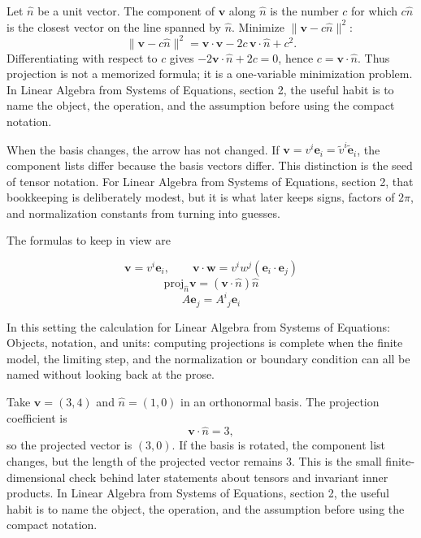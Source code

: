Let \(\hat n\) be a unit vector.  The component of \(\bm v\) along \(\hat n\) is the number \(c\) for which \(c\hat n\) is the closest vector on the line spanned by \(\hat n\).  Minimize \(\|\bm v-c\hat n\|^2\):
\[
  \|\bm v-c\hat n\|^2=\bm v\cdot\bm v-2c\,\bm v\cdot\hat n+c^2.
\]
Differentiating with respect to \(c\) gives \(-2\bm v\cdot\hat n+2c=0\), hence \(c=\bm v\cdot\hat n\).  Thus projection is not a memorized formula; it is a one-variable minimization problem.  In Linear Algebra from Systems of Equations, section 2, the useful habit is to name the object, the operation, and the assumption before using the compact notation.

When the basis changes, the arrow has not changed.  If \(\bm v=v^i\bm e_i=\tilde v^i\tilde{\bm e}_i\), the component lists differ because the basis vectors differ.  This distinction is the seed of tensor notation.  For Linear Algebra from Systems of Equations, section 2, that bookkeeping is deliberately modest, but it is what later keeps signs, factors of \(2\pi\), and normalization constants from turning into guesses.

The formulas to keep in view are

\[
  \bm v=v^i\bm e_i,\qquad \bm v\cdot\bm w=v^iw^j(\bm e_i\cdot\bm e_j)
\]
\[
  \mathrm{proj}_{\hat n}\bm v=(\bm v\cdot\hat n)\hat n
\]
\[
  A\bm e_j=A^i{}_j\bm e_i
\]

In this setting the calculation for Linear Algebra from Systems of Equations: Objects, notation, and units: computing projections is complete when the finite model, the limiting step, and the normalization or boundary condition can all be named without looking back at the prose.




\begin{example}
Take \(\bm v=(3,4)\) and \(\hat n=(1,0)\) in an orthonormal basis.  The projection coefficient is
\[
  \bm v\cdot\hat n=3,
\]
so the projected vector is \((3,0)\).  If the basis is rotated, the component list changes, but the length of the projected vector remains \(3\).  This is the small finite-dimensional check behind later statements about tensors and invariant inner products.  In Linear Algebra from Systems of Equations, section 2, the useful habit is to name the object, the operation, and the assumption before using the compact notation.
\end{example}




